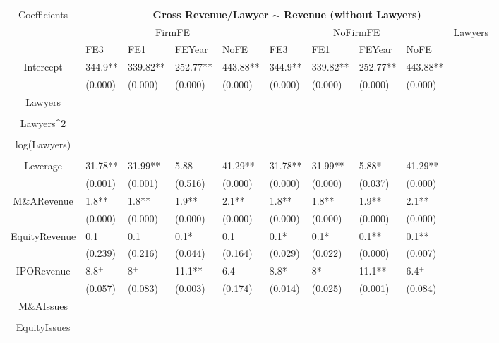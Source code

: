 \documentclass{article}
\begin{document}
\begin{table}[H]
\centering
\begin{tabular}{|clllllllll|}
\hline
\multirow{3}{*}{Coefficients} & \multicolumn{9}{c|}{\textbf{Gross Revenue/Lawyer $\sim$ Revenue (without Lawyers)}} \\
\cline{2-10}
& \multicolumn{4}{c}{FirmFE} & \multicolumn{4}{c}{NoFirmFE} & \multirow{2}{*}{Lawyers} \\
\cline{2-9}
& FE3 & FE1 & FEYear & NoFE & FE3 & FE1 & FEYear & NoFE &  \\
\hline
 
Intercept & 344.9** & 339.82** & 252.77** & 443.88** & 344.9** & 339.82** & 252.77** & 443.88** & \\ 
   & (0.000) & (0.000) & (0.000) & (0.000) & (0.000) & (0.000) & (0.000) & (0.000) & \\ 
  Lawyers &  &  &  &  &  &  &  &  & \\ 
   &  &  &  &  &  &  &  &  & \\ 
  Lawyers^2 &  &  &  &  &  &  &  &  & \\ 
   &  &  &  &  &  &  &  &  & \\ 
  log(Lawyers) &  &  &  &  &  &  &  &  & \\ 
   &  &  &  &  &  &  &  &  & \\ 
  Leverage & 31.78** & 31.99** & 5.88 & 41.29** & 31.78** & 31.99** & 5.88* & 41.29** & \\ 
   & (0.001) & (0.001) & (0.516) & (0.000) & (0.000) & (0.000) & (0.037) & (0.000) & \\ 
  M\&ARevenue & 1.8** & 1.8** & 1.9** & 2.1** & 1.8** & 1.8** & 1.9** & 2.1** & \\ 
   & (0.000) & (0.000) & (0.000) & (0.000) & (0.000) & (0.000) & (0.000) & (0.000) & \\ 
  EquityRevenue & 0.1 & 0.1 & 0.1* & 0.1 & 0.1* & 0.1* & 0.1** & 0.1** & \\ 
   & (0.239) & (0.216) & (0.044) & (0.164) & (0.029) & (0.022) & (0.000) & (0.007) & \\ 
  IPORevenue & 8.8$^{+}$ & 8$^{+}$ & 11.1** & 6.4 & 8.8* & 8* & 11.1** & 6.4$^{+}$ & \\ 
   & (0.057) & (0.083) & (0.003) & (0.174) & (0.014) & (0.025) & (0.001) & (0.084) & \\ 
  M\&AIssues &  &  &  &  &  &  &  &  & \\ 
   &  &  &  &  &  &  &  &  & \\ 
  EquityIssues &  &  &  &  &  &  &  &  & \\ 

\end{tabular}
\end{table}
\end{document}
